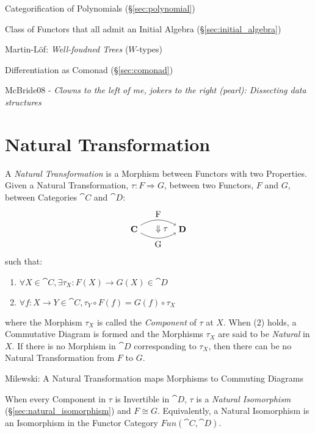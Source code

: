 Categorification of Polynomials (\S\ref{sec:polynomial})

Class of Functors that all admit an Initial Algebra
(\S\ref{sec:initial_algebra})

Martin-L\"of: \emph{Well-foudned Trees} ($W$-types) %

Differentiation as Comonad (\S\ref{sec:comonad})

McBride08 - \emph{Clowns to the left of me, jokers to the right (pearl):
  Dissecting data structures}



\section{Natural Transformation}\label{sec:natural_transformation}

A \emph{Natural Transformation} is a Morphism between Functors with
two Properties. Given a Natural Transformation, $\tau : F \Rightarrow
G$, between two Functors, $F$ and $G$, between Categories $\cat{C}$
and $\cat{D}$:
\[
  \begin{tikzpicture}
    \node (C) at (-1,0) {$\cat{C}$};
    \node (D) at (1,0) {$\cat{D}$};
    \node (T) at (0,0) {$\;\;\;\Downarrow\tau$};
    \draw[->,bend left] (C) to node [above] {F} (D);
    \draw[->,bend right] (C) to node [below] {G} (D);
  \end{tikzpicture}
\]
such that:
\begin{enumerate}
  \item $\forall X \in \cat{C},
    \exists \tau_X : F(X) \rightarrow G(X) \in \cat{D}$
  \item $\forall f : X \rightarrow Y \in \cat{C},
    \tau_Y \circ F(f) = G(f) \circ \tau_X$
\end{enumerate}
where the Morphism $\tau_X$ is called the \emph{Component} of $\tau$
at $X$. When (2) holds, a Commutative Diagram is formed and the
Morphisms $\tau_X$ are said to be \emph{Natural} in $X$. If there is
no Morphism in $\cat{D}$ corresponding to $\tau_X$, then there can
be no Natural Transformation from $F$ to $G$.

Milewski: A Natural Transformation maps Morphisms to Commuting
Diagrams

When every Component in $\tau$ is Invertible in $\cat{D}$, $\tau$ is a
\emph{Natural Isomorphism} (\S\ref{sec:natural_isomorphism}) and $F
\cong G$. Equivalently, a Natural Isomorphism is an Isomorphism in the
Functor Category $Fun(\cat{C},\cat{D})$.

